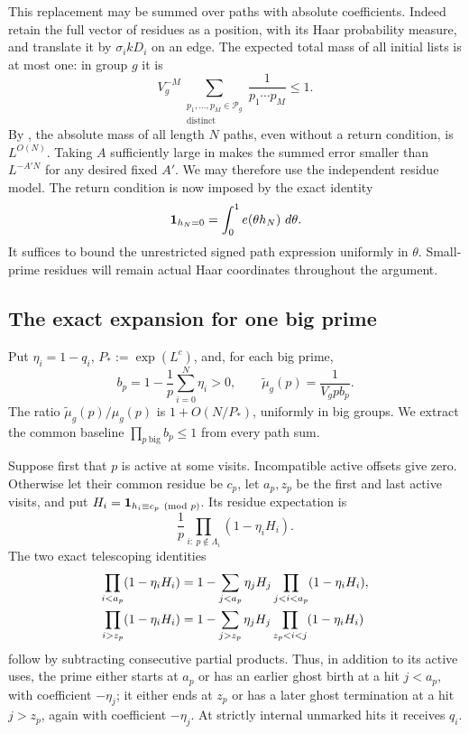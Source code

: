 This replacement may be summed over paths with absolute
coefficients.  Indeed retain the full vector of residues as a
position, with its Haar probability measure, and translate it
by $\sigma_i kD_i$ on an edge.  The expected total mass of all
initial lists is at most one: in group $g$ it is
\begin{equation}\label{eq:initial-factorial-mass}
 V_g^{-M}\sum_{\substack{p_1,\ldots,p_M\in\mathcal P_g\\
                         \text{distinct}}}\frac1{p_1\cdots p_M}
 \le1.
\end{equation}
By , the absolute mass of all length
$N$ paths, even without a return condition, is $L^{O(N)}$.
Taking $A$ sufficiently large in 
makes the summed error smaller than $L^{-A' N}$ for any desired
fixed $A'$.  We may therefore use the independent residue model.
The return condition is now imposed by the exact identity
\begin{equation}\label{eq:return-fourier}
 \mathbf 1_{h_N=0}=\int_0^1e\!\left(\theta h_N\right)\,d\theta.
\end{equation}
It suffices to bound the unrestricted signed path expression
uniformly in $\theta$.  Small-prime residues will remain actual
Haar coordinates throughout the argument.

\subsection{The exact expansion for one big prime}

Put $\eta_i=1-q_i$, $P_*:=\exp(L^c)$, and, for each big prime,
\begin{equation}\label{eq:lifespan-baseline}
 b_p=1-\frac1p\sum_{i=0}^N\eta_i>0,
 \qquad \widetilde\mu_g(p)=\frac1{V_gpb_p}.
\end{equation}
The ratio $\widetilde\mu_g(p)/\mu_g(p)$ is
$1+O(N/P_*)$, uniformly in big groups.  We extract the common
baseline $\prod_{p\ \text{big}}b_p\le1$ from every path sum.

Suppose first that $p$ is active at some visits.  Incompatible
active offsets give zero.  Otherwise let their common residue
be $c_p$, let $a_p,z_p$ be the first and last active visits, and
put $H_i=\mathbf 1_{h_i\equiv c_p\pmod p}$.  Its residue expectation
is
\[
 \frac1p\prod_{i:\ p\notin\Lambda_i}(1-\eta_iH_i).
\]
The two exact telescoping identities
\begin{align}
 \prod_{i<a_p}(1-\eta_iH_i)
 &=1-\sum_{j<a_p}\eta_jH_j
                     \prod_{j<i<a_p}(1-\eta_iH_i),\label{eq:prefix-ghost}\\
 \prod_{i>z_p}(1-\eta_iH_i)
 &=1-\sum_{j>z_p}\eta_jH_j
                     \prod_{z_p<i<j}(1-\eta_iH_i)\notag
\end{align}
follow by subtracting consecutive partial products.  Thus, in
addition to its active uses, the prime either starts at $a_p$
or has an earlier ghost birth at a hit $j<a_p$, with coefficient
$-\eta_j$; it either ends at $z_p$ or has a later ghost
termination at a hit $j>z_p$, again with coefficient $-\eta_j$.
At strictly internal unmarked hits it receives $q_i$.

